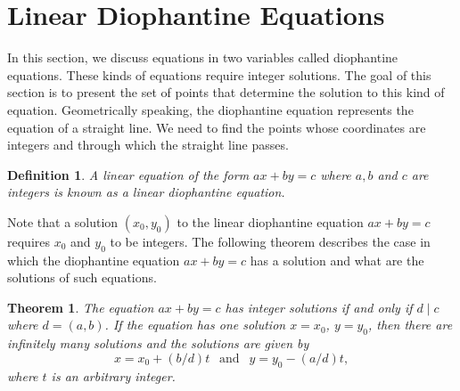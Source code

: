 \documentclass[12pt,letterpaper]{book}
\newtheorem{definition}{Definition}
\newtheorem{theorem}{Theorem}
\begin{document}
\newpage

\section{Linear Diophantine Equations}
 In this section, we discuss equations
in two variables called diophantine equations.  These kinds of
equations require integer solutions.  The goal of this section is to
present the set of points that determine the solution to this kind
of equation. Geometrically speaking, the diophantine equation
represents the equation of a straight line.  We need to find the
points whose coordinates are integers and through which the straight
line passes. 
\begin{definition}
A linear equation of the form $ax+by=c$ where $a,b$ and $c$ are
integers is known as a linear diophantine equation.
\end{definition}

Note that a solution $(x_0,y_0)$ to the linear diophantine equation $ax+by=c$
requires $x_0$ and $y_0$ to be integers.  The following theorem
describes the case in which the diophantine equation $ax+by=c$ has a solution
and what are the solutions of such equations.

\begin{theorem}\label{LDEThm}
The equation $ax+by=c$ has integer solutions if and only if $d\mid
c$ where $d=(a,b)$.  If the equation has one solution $x=x_0$,
$y=y_0$, then there are infinitely many solutions and the solutions
are given by
\begin{equation*}
x=x_0+(b/d)t \ \ \text{~and~} \ \ y=y_0-(a/d)t,
\end{equation*}
where $t$ is an arbitrary integer.
\end{theorem}
\end{document}
